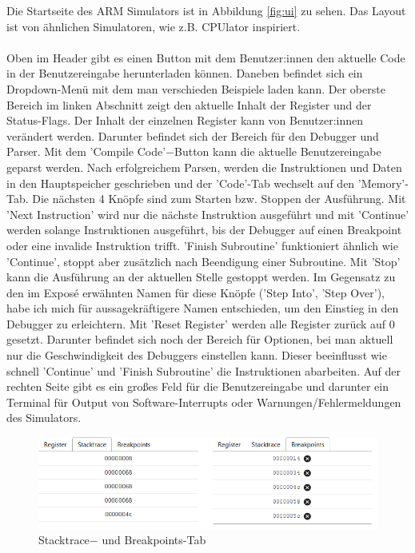 \documentclass[a4paper, 11pt, onecolumn]{article}
\begin{document}
Die Startseite des ARM Simulators ist in Abbildung \ref{fig:ui} zu sehen. Das Layout ist von ähnlichen Simulatoren, wie z.B. CPUlator \cite{cpulator} inspiriert.\\ \\
Oben im Header gibt es einen Button mit dem Benutzer:innen den aktuelle Code in der Benutzereingabe herunterladen können. Daneben befindet sich ein Dropdown-Menü mit dem man verschieden Beispiele laden kann.
Der oberste Bereich im linken Abschnitt zeigt den aktuelle Inhalt der Register und der Status-Flags. Der Inhalt der einzelnen Register kann von Benutzer:innen verändert werden. Darunter befindet sich der Bereich für den Debugger und Parser. Mit dem 'Compile Code'$-$Button kann die aktuelle Benutzereingabe geparst werden. Nach erfolgreichem Parsen, werden die Instruktionen und Daten in den Hauptspeicher geschrieben und der 'Code'-Tab wechselt auf den 'Memory'-Tab. Die nächsten 4 Knöpfe sind zum Starten bzw. Stoppen der Ausführung. Mit 'Next Instruction' wird nur die nächste Instruktion ausgeführt und mit 'Continue' werden solange Instruktionen ausgeführt, bis der Debugger auf einen Breakpoint oder eine invalide Instruktion trifft. 'Finish Subroutine' funktioniert ähnlich wie 'Continue', stoppt aber zusätzlich nach Beendigung einer Subroutine. Mit 'Stop' kann die Ausführung an der aktuellen Stelle gestoppt werden. Im Gegensatz zu den im Exposé erwähnten Namen für diese Knöpfe ('Step Into', 'Step Over'), habe ich mich für aussagekräftigere Namen entschieden, um den Einstieg in den Debugger zu erleichtern. Mit 'Reset Register' werden alle Register zurück auf 0 gesetzt. Darunter befindet sich noch der Bereich für Optionen, bei man aktuell nur die Geschwindigkeit des Debuggers einstellen kann. Dieser beeinflusst wie schnell 'Continue' und 'Finish Subroutine' die Instruktionen abarbeiten. Auf der rechten Seite gibt es ein großes Feld für die Benutzereingabe und darunter ein Terminal für Output von Software-Interrupts oder Warnungen/Fehlermeldungen des Simulators.

\begin{figure}[!htb]
\centering
\includegraphics[width=1\textwidth]{data/stackBreak}
\caption{Stacktrace$-$ und Breakpoints-Tab}
\label{fig:stackbreak}
\end{figure}
\end{document}
